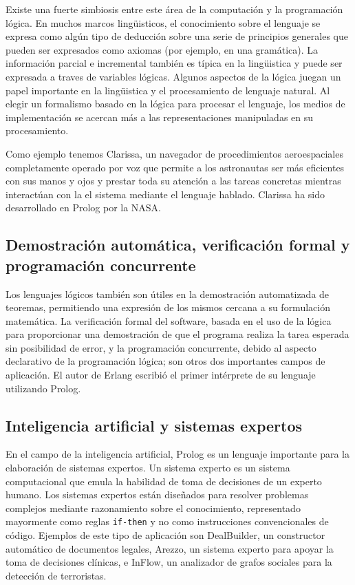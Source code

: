 \documentclass[11pt,captions=nooneline,DIV=14, parskip=full]{scrartcl}
\begin{document}
Existe una fuerte simbiosis entre este área de la computación y la programación lógica. En muchos marcos lingüisticos, el conocimiento sobre el lenguaje se expresa como algún tipo de deducción sobre una serie de principios generales que pueden ser expresados como axiomas (por ejemplo, en una gramática). La información parcial e incremental también es típica en la lingüistica y puede ser expresada a traves de variables lógicas. Algunos aspectos de la lógica juegan un papel importante en la lingüistica y el procesamiento de lenguaje natural. Al elegir un formalismo basado en la lógica para procesar el lenguaje, los medios de implementación se acercan más a las representaciones manipuladas en su procesamiento.

Como ejemplo tenemos Clarissa, un navegador de procedimientos aeroespaciales completamente operado por voz que permite a los astronautas ser más eficientes con sus manos y ojos y prestar toda su atención a las tareas concretas mientras interactúan con la el sistema mediante el lenguaje hablado. Clarissa ha sido desarrollado en Prolog por la NASA.

\subsection{Demostración automática, verificación formal y programación concurrente}
Los lenguajes lógicos también son útiles en la demostración automatizada de teoremas, permitiendo una expresión de los mismos cercana a su formulación matemática. La verificación formal del software, basada en el uso de la lógica para proporcionar una demostración de que el programa realiza la tarea esperada sin posibilidad de error, y la programación concurrente, debido al aspecto declarativo de la programación lógica; son otros dos importantes campos de aplicación. El autor de Erlang escribió el primer intérprete de su lenguaje utilizando Prolog.

\subsection{Inteligencia artificial y sistemas expertos}
En el campo de la inteligencia artificial, Prolog es un lenguaje importante para la elaboración de sistemas expertos. Un sistema experto es un sistema computacional que emula la habilidad de toma de decisiones de un experto humano. Los sistemas expertos están diseñados para resolver problemas complejos mediante razonamiento sobre el conocimiento, representado mayormente como reglas \texttt{if-then} y no como instrucciones convencionales de código. Ejemplos de este tipo de aplicación son DealBuilder, un constructor automático de documentos legales, Arezzo, un sistema experto para apoyar la toma de decisiones clínicas, e InFlow, un analizador de grafos sociales para la detección de terroristas.
\end{document}
